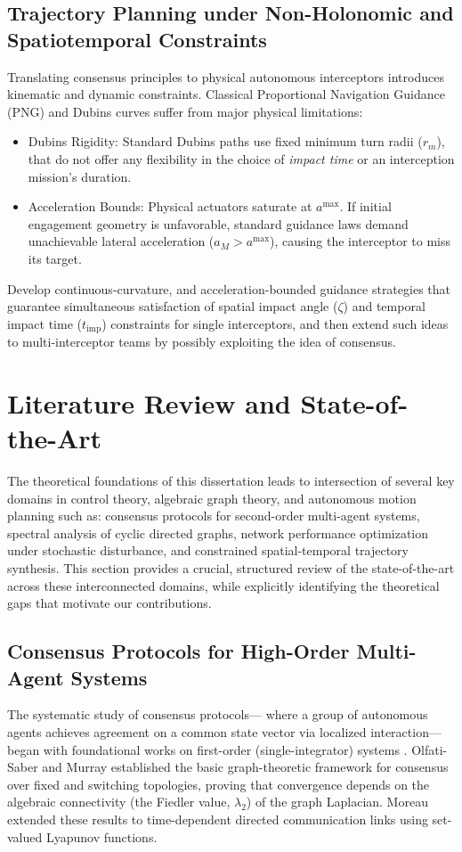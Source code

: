 \subsection{Trajectory Planning under Non-Holonomic and Spatio\-temporal Constraints}
Translating consensus principles to physical autonomous interceptors introduces kinematic and dynamic constraints. Classical Proportional Navigation Guidance (PNG) and Dubins curves suffer from major physical limitations:
\begin{itemize}
    \item Dubins Rigidity: Standard Dubins paths use fixed minimum turn radii ($r_m$), that do not offer any flexibility in the choice of \emph{impact time} or an interception mission's duration.
    \item Acceleration Bounds: Physical actuators saturate at $a^{\text{max}}$. If initial engagement geometry is unfavorable, standard guidance laws demand unachievable lateral acceleration ($a_M > a^{\text{max}}$), causing the interceptor to miss its target. 
\end{itemize}
\begin{problem}
    Develop continuous-curvature, and acceleration-bounded guidance strategies that guarantee simultaneous satisfaction of spatial impact angle ($\zeta$) and temporal impact time ($t_{\text{imp}}$) constraints for single interceptors, and then extend such ideas to multi-interceptor teams by possibly exploiting the idea of consensus.
\end{problem}
\section{Literature Review and State-of-the-Art}
The theoretical foundations of this dissertation leads to intersection of several key domains in control theory, algebraic graph theory, and autonomous motion planning such as: consensus protocols for second-order multi-agent systems, spectral analysis of cyclic directed graphs, network performance optimization under stochastic disturbance, and constrained spatial-temporal trajectory synthesis. This section provides a crucial, structured review of the state-of-the-art across these interconnected domains, while explicitly identifying the theoretical gaps that motivate our contributions.

\subsection{Consensus Protocols for High-Order Multi-Agent Systems}
The systematic study of consensus protocols— where a group of autonomous agents achieves agreement on a common state vector via localized interaction— began with foundational works on first-order (single-integrator) systems \cite{saber2003consensus, jadbabaie2003coordination, fax2004information, 1333204}. Olfati-Saber and Murray \cite{saber2003consensus} established the basic graph-theoretic framework for consensus over fixed and switching topologies, proving that convergence depends on the algebraic connectivity (the Fiedler value, $\lambda_2$) of the graph Laplacian. Moreau \cite{moreau2005stability} extended these results to time-dependent directed communication links using set-valued Lyapunov functions.

